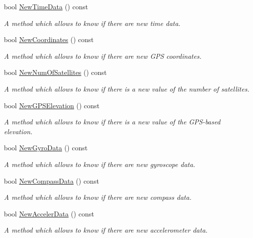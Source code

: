 \begin{DoxyCompactItemize}
bool \hyperlink{classGPSInterface_af2656b318d0476d12067861d2477df52}{New\+Time\+Data} () const
\begin{DoxyCompactList}\small\item\em A method which allows to know if there are new time data. \end{DoxyCompactList}\item 
bool \hyperlink{classGPSInterface_af09baa1ae4d3b7618272d1c5bfbc5bd6}{New\+Coordinates} () const
\begin{DoxyCompactList}\small\item\em A method which allows to know if there are new G\+PS coordinates. \end{DoxyCompactList}\item 
bool \hyperlink{classGPSInterface_af4bce28d69aae9fe5d256ad6ec35cd9d}{New\+Num\+Of\+Satellites} () const
\begin{DoxyCompactList}\small\item\em A method which allows to know if there is a new value of the number of satellites. \end{DoxyCompactList}\item 
bool \hyperlink{classGPSInterface_a9d8395626efc9a191ff2635c486dbd56}{New\+G\+P\+S\+Elevation} () const
\begin{DoxyCompactList}\small\item\em A method which allows to know if there is a new value of the G\+P\+S-\/based elevation. \end{DoxyCompactList}\item 
bool \hyperlink{classGPSInterface_a009d3be64d7b6fbc26f3afc0e6b5e364}{New\+Gyro\+Data} () const
\begin{DoxyCompactList}\small\item\em A method which allows to know if there are new gyroscope data. \end{DoxyCompactList}\item 
bool \hyperlink{classGPSInterface_a4ced63a896cdadd2c49dab6beb0502a5}{New\+Compass\+Data} () const
\begin{DoxyCompactList}\small\item\em A method which allows to know if there are new compass data. \end{DoxyCompactList}\item 
bool \hyperlink{classGPSInterface_aa8f9b0517efbb5566a0a9220f23dd07a}{New\+Acceler\+Data} () const
\begin{DoxyCompactList}\small\item\em A method which allows to know if there are new accelerometer data. \end{DoxyCompactList}\item 

\end{DoxyCompactItemize}
